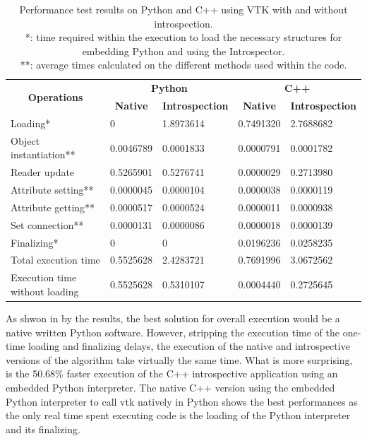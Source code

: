 \begin{table}[ht!]
    \centering
    \begin{tabular}{lllll}
    \hline
    \multicolumn{1}{c}{\multirow{2}{*}{\textbf{Operations}}} &
      \multicolumn{2}{c}{\textbf{Python}} &
      \multicolumn{2}{c}{\textbf{C++}} \\ 
    \multicolumn{1}{c}{} &
      \multicolumn{1}{c}{\textbf{Native}} &
      \multicolumn{1}{c}{\textbf{Introspection}} &
      \multicolumn{1}{c}{\textbf{Native}} &
      \multicolumn{1}{c}{\textbf{Introspection}} \\ \hhline{=====}
    Loading*                       & \multicolumn{1}{l}{0}         & 1.8973614 & 0.7491320 & 2.7688682 \\
    Object instantiation**         & \multicolumn{1}{l}{0.0046789} & 0.0001833 & 0.0000791 & 0.0001782 \\
    Reader update                  & \multicolumn{1}{l}{0.5265901} & 0.5276741 & 0.0000029 & 0.2713980 \\
    Attribute setting**            & \multicolumn{1}{l}{0.0000045} & 0.0000104 & 0.0000038 & 0.0000119 \\
    Attribute getting**            & \multicolumn{1}{l}{0.0000517} & 0.0000524 & 0.0000011 & 0.0000938 \\
    Set connection**               & \multicolumn{1}{l}{0.0000131} & 0.0000086 & 0.0000018 & 0.0000139 \\
    Finalizing*                    & \multicolumn{1}{l}{0}         & 0         & 0.0196236 & 0.0258235 \\ \hline
    Total execution time           & \multicolumn{1}{l}{0.5525628} & 2.4283721 & 0.7691996 & 3.0672562 \\ \hline
    Execution time without loading & \multicolumn{1}{l}{0.5525628} & 0.5310107 & 0.0004440 & 0.2725645 \\ \hline
    \end{tabular}
    \caption{Performance test results on Python and C++ using VTK with and without introspection.\\
    *: time required within the execution to load the necessary structures for embedding Python and using the Introspector.\\
    **: average times calculated on the different methods used within the code.}
    \label{tab:streamtracer-performance-tests-results}
\end{table}

As shwon in by the results, the best solution for overall execution would be a native written Python software. However, stripping the execution time of the one-time loading and finalizing delays, the execution of the native and introspective versions of the algorithm take virtually the same time. What is more surprising, is the 50.68\% faster execution of the C++ introspective application using an embedded Python interpreter. The native C++ version using the embedded Python interpreter to call \acrshort{vtk} natively in Python shows the best performances as the only real time spent executing code is the loading of the Python interpreter and its finalizing.

